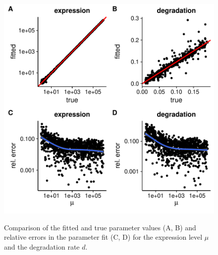 \begin{figure}
 \includegraphics[width=\linewidth]{fig/parameters}\\
 \caption{Comparison of the fitted and true parameter values (A, B) and 
 relative errors in the parameter fit (C, D) for the expression level $\mu$ 
 and the degradation rate $d$.}
 \label{fig:errors}
\end{figure}
